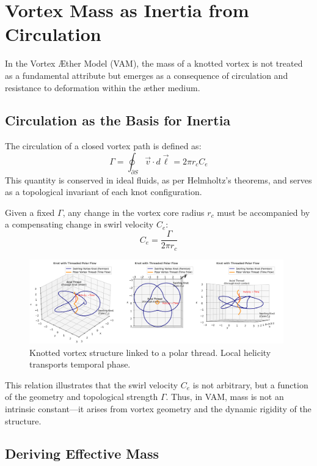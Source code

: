 \section{Vortex Mass as Inertia from Circulation}

In the Vortex Æther Model (VAM), the mass of a knotted vortex is not treated as a fundamental attribute but emerges as a consequence of circulation and resistance to deformation within the æther medium.

\subsection*{Circulation as the Basis for Inertia}

The circulation of a closed vortex path is defined as:
\[
    \Gamma = \oint_{\partial S} \vec{v} \cdot d\vec{\ell} = 2\pi r_c C_e
\]
This quantity is conserved in ideal fluids, as per Helmholtz’s theorems, and serves as a topological invariant of each knot configuration.

Given a fixed $\Gamma$, any change in the vortex core radius $r_c$ must be accompanied by a compensating change in swirl velocity $C_e$:
\[
    C_e = \frac{\Gamma}{2\pi r_c}
\]

\begin{figure}[h!]
    \centering
    \includegraphics[width=0.98\textwidth]{KnotThreadedPolarFlow.png}
    \caption{Knotted vortex structure linked to a polar thread. Local helicity transports temporal phase.}
\end{figure}

This relation illustrates that the swirl velocity $C_e$ is not arbitrary, but a function of the geometry and topological strength $\Gamma$. Thus, in VAM, mass is not an intrinsic constant—it arises from vortex geometry and the dynamic rigidity of the structure.

\subsection*{Deriving Effective Mass}

